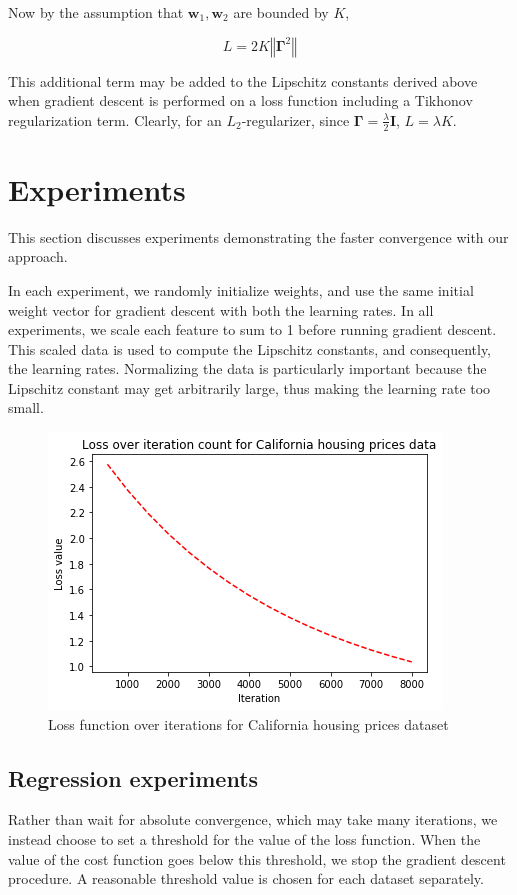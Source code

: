 \documentclass{article}
\begin{document}
Now by the assumption that $\textbf{w}_1, \textbf{w}_2$ are bounded by $K$, 

\[
    \boxed{
        L = 2K \left\Vert \boldsymbol\Gamma^2 \right\Vert
    }
\]

This additional term may be added to the Lipschitz constants derived above when gradient descent is performed on a loss function including a Tikhonov regularization term. Clearly, for an $L_2$-regularizer, since $\boldsymbol\Gamma = \frac{\lambda}{2}\textbf{I}$, $L = \lambda K$.

\section{Experiments}
This section discusses experiments demonstrating the faster convergence with our approach. 

In each experiment, we randomly initialize weights, and use the same initial weight vector for gradient descent with both the learning rates. In all experiments, we scale each feature to sum to 1 before running gradient descent. This scaled data is used to compute the Lipschitz constants, and consequently, the learning rates. Normalizing the data is particularly important because the Lipschitz constant may get arbitrarily large, thus making the learning rate too small.

\begin{figure}
    \centering
    \includegraphics[scale=0.5]{cali.png}
    \caption{Loss function over iterations for California housing prices dataset}
    \label{fig:leastsq:1}
\end{figure}

\subsection{Regression experiments} \label{regexpts}
Rather than wait for absolute convergence, which may take many iterations, we instead choose to set a threshold for the value of the loss function. When the value of the cost function goes below this threshold, we stop the gradient descent procedure. A reasonable threshold value is chosen for each dataset separately.
\end{document}
